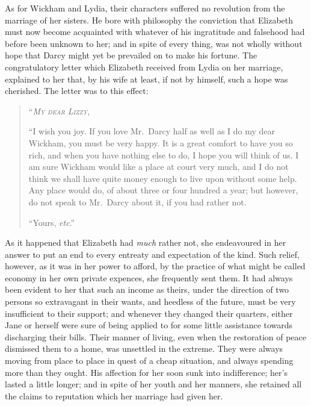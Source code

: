 \documentclass[12pt,english,oneside]{book}
\newcommand{\noun}[1]{\textsc{#1}}
\begin{document}
As for Wickham and Lydia, their characters suffered no revolution
from the marriage of her sisters. He bore with philosophy the conviction
that Elizabeth must now become acquainted with whatever of his ingratitude
and falsehood had before been unknown to her; and in spite of every
thing, was not wholly without hope that Darcy might yet be prevailed
on to make his fortune. The congratulatory letter which Elizabeth
received from Lydia on her marriage, explained to her that, by his
wife at least, if not by himself, such a hope was cherished. The letter
was to this effect:

\begin{quotation}
\noindent {}``\textit{\emph{\noun{My}}} \textit{\emph{\noun{dear}}}
\textit{\emph{\noun{Lizzy}}},

{}``I wish you joy. If you love Mr.\ Darcy half as well as I do
my dear Wickham, you must be very happy. It is a great comfort to
have you so rich, and when you have nothing else to do, I hope you
will think of us. I am sure Wickham would like a place at court very
much, and I do not think we shall have quite money enough to live
upon without some help. Any place would do, of about three or four
hundred a year; but however, do not speak to Mr.\ Darcy about it,
if you had rather not.

``Yours, \textit{etc}.'' 
\end{quotation}
As it happened that Elizabeth had \textit{much} rather not, she endeavoured
in her answer to put an end to every entreaty and expectation of the
kind. Such relief, however, as it was in her power to afford, by the
practice of what might be called economy in her own private expences,
she frequently sent them. It had always been evident to her that such
an income as theirs, under the direction of two persons so extravagant
in their wants, and heedless of the future, must be very insufficient
to their support; and whenever they changed their quarters, either
Jane or herself were sure of being applied to for some little assistance
towards discharging their bills. Their manner of living, even when
the restoration of peace dismissed them to a home, was unsettled in
the extreme. They were always moving from place to place in quest
of a cheap situation, and always spending more than they ought. His
affection for her soon sunk into indifference; her's lasted a little
longer; and in spite of her youth and her manners, she retained all
the claims to reputation which her marriage had given her.
\end{document}
